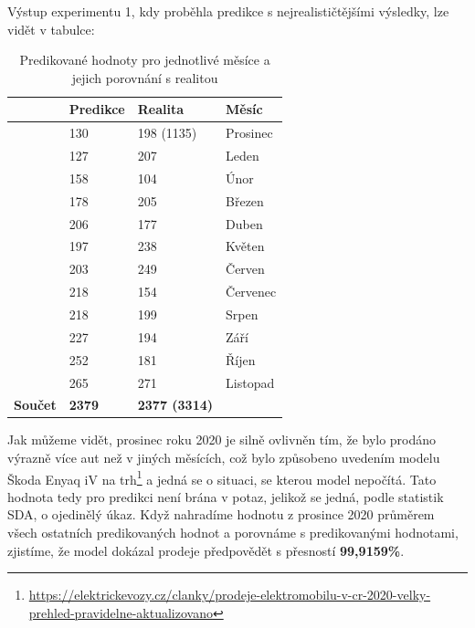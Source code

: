 \documentclass[14pt]{extarticle}
\begin{document}
    Výstup experimentu 1, kdy proběhla predikce s nejrealističtějšími výsledky, lze vidět v tabulce:
    
    \begin{table}[H]
    \centering
    \captionsetup{justification=centering}

        \begin{tabular}{|l|l|l|l|}
        \hline
                        & \textbf{Predikce} & \textbf{Realita}     & \textbf{Měsíc} \\ \hline
                        & 130               & 198 (1135)           & Prosinec       \\ \hline
                        & 127               & 207                  & Leden          \\ \hline
                        & 158               & 104                  & Únor           \\ \hline
                        & 178               & 205                  & Březen         \\ \hline
                        & 206               & 177                  & Duben          \\ \hline
                        & 197               & 238                  & Květen         \\ \hline
                        & 203               & 249                  & Červen         \\ \hline
                        & 218               & 154                  & Červenec       \\ \hline
                        & 218               & 199                  & Srpen          \\ \hline
                        & 227               & 194                  & Září           \\ \hline
                        & 252               & 181                  & Říjen          \\ \hline
                        & 265               & 271                  & Listopad       \\ \hline
        \textbf{Součet} & \textbf{2379}     & \textbf{2377 (3314)} &                \\ \hline
        \end{tabular}
        \caption{Predikované hodnoty pro jednotlivé měsíce a jejich porovnání s realitou}
    \end{table}
    
    Jak můžeme vidět, prosinec roku 2020 je silně ovlivněn tím, že bylo prodáno výrazně více aut než v jiných měsících, což bylo způsobeno uvedením modelu Škoda Enyaq iV na trh\footnote{\url{https://elektrickevozy.cz/clanky/prodeje-elektromobilu-v-cr-2020-velky-prehled-pravidelne-aktualizovano}} a jedná se o situaci, se kterou model nepočítá. Tato hodnota tedy pro predikci není brána v potaz, jelikož se jedná, podle statistik SDA, o ojedinělý úkaz. Když nahradíme hodnotu z prosince 2020 průměrem všech ostatních predikovaných hodnot a porovnáme s predikovanými hodnotami, zjistíme, že model dokázal prodeje předpovědět s přesností \textbf{99,9159\%}.
    
\end{document}
